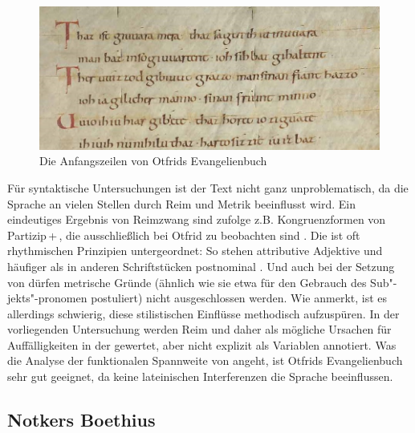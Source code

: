 \begin{figure}[h]
\begin{center}
  \includegraphics[width=10 cm]{images/otfrid-handschrift-ausschnitt.jpg}
  \caption {Die Anfangszeilen von Otfrids Evangelienbuch}
\label{abb:otfrid-hand}
\end{center}
\end{figure} 



Für syntaktische Untersuchungen ist der Text nicht ganz unproblematisch, da die Sprache an vielen Stellen durch Reim und Metrik beeinflusst wird. Ein eindeutiges Ergebnis von  Reimzwang  sind \textcite[35--36]{Fleischer2006} zufolge z.B. Kongruenzformen von Partizip\,+\,, die ausschließlich bei Otfrid zu beobachten sind \parencites()()[s. auch][52]{Fleischer2011}[]{Gillmann2016}. 
Die  ist oft rhythmischen Prinzipien untergeordnet: So stehen attributive Adjektive  und  häufiger als in anderen Schriftstücken postnominal \parencites()()[282--283]{Oubouzar1989}[29]{Schrodt2004}. Und auch bei der Setzung von  dürfen metrische  Gründe (ähnlich wie  \textcite{Eggenberger1961} sie etwa für den Gebrauch des  Sub"-jekts"-pronomen postuliert) nicht ausgeschlossen werden. Wie \textcite[37]{Fleischer2006} anmerkt, ist es allerdings schwierig, diese stilistischen Einflüsse methodisch aufzuspüren. In der vorliegenden Untersuchung werden Reim  und  daher als mögliche Ursachen für Auffälligkeiten in der  gewertet, aber nicht explizit als Variablen annotiert. Was die Analyse der funktionalen Spannweite von  angeht, ist Otfrids Evangelienbuch sehr gut geeignet, da keine lateinischen Interferenzen die Sprache beeinflussen. 

\subsection{Notkers Boethius} \label{sec:notker}

